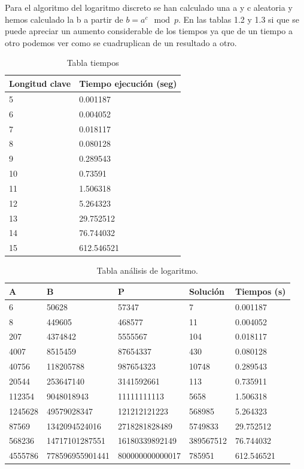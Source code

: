 Para el algoritmo del logaritmo discreto se han calculado una a y c aleatoria y hemos calculado la b a partir de $b = a^c\mod p$. En las tablas 1.2 y 1.3 si que se puede apreciar un aumento considerable de los tiempos ya que de un tiempo a otro podemos ver como se cuadruplican de un resultado a otro. \\

\begin{table}[htbp]
	\begin{center}
		\begin{tabular}{|l|l|}
			\hline
			\rowcolor{LightCyan}
			Longitud clave & Tiempo ejecución (seg) \\ \hline
			5 & 0.001187 \\ \hline 
			6 & 0.004052 \\ \hline
			7 & 0.018117 \\ \hline
			8 & 0.080128\\ \hline
			9 & 0.289543\\ \hline
			10 & 0.73591\\ \hline
			11 & 1.506318\\ \hline
			12 & 5.264323\\ \hline
			13 & 29.752512\\ \hline
			14 & 76.744032 \\ \hline
			15 & 612.546521\\ \hline
		\end{tabular}
		\caption{Tabla tiempos}
		\label{tabla:resumen}
	\end{center}
\end{table}


\begin{table}[htbp]
	\begin{center}
		\begin{tabular}{|l|l|l|l|l|}
			\hline 
			\rowcolor{LightCyan}
			A & B & P & Solución & Tiempos (s) \\ \hline
			6 & 50628 & 57347& 7 & 0.001187 \\ \hline 
			8 & 449605 & 468577& 11 & 0.004052 \\ \hline
			207 & 4374842 & 5555567& 104 & 0.018117 \\ \hline
			4007 & 8515459 & 87654337& 430 & 0.080128\\ \hline
			40756 & 118205788 & 987654323& 10748 & 0.289543\\ \hline
			20544 & 253647140 & 3141592661& 113 & 0.735911\\ \hline
			112354 & 9048018943 & 11111111113& 5658 & 1.506318\\ \hline
			1245628 & 49579028347 & 121212121223& 568985 & 5.264323\\ \hline
			87569 & 1342094524016 & 2718281828489& 5749833 & 29.752512\\ \hline
			568236 & 14717101287551 & 16180339892149& 389567512 & 76.744032\\ \hline
			4555786 & 778596955901441 & 800000000000017& 785951 & 612.546521\\ \hline
		\end{tabular}
		\caption{Tabla análisis de logaritmo.}
		\label{tabla:compleja}
	\end{center}
\end{table}

